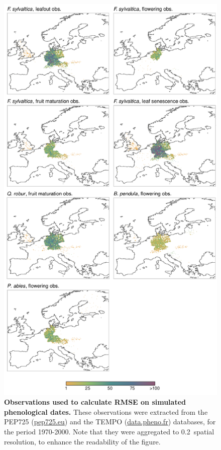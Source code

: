 \begin{figure}[hp]
\vspace*{-0.3cm}
\centering
\includegraphics{chapter3/figs/figS1-1.pdf}
\caption{\textbf{Observations used to calculate RMSE on simulated phenological dates.} These observations were extracted from the PEP725 (\url{pep725.eu}) and the TEMPO (\url{data.pheno.fr}) databases, for the period 1970-2000. Note that they were aggregated to 0.2\degree~spatial resolution, to enhance the readability of the figure.}
\label{fig:phenologicalrecords}
\vspace*{-5cm}
\end{figure}

